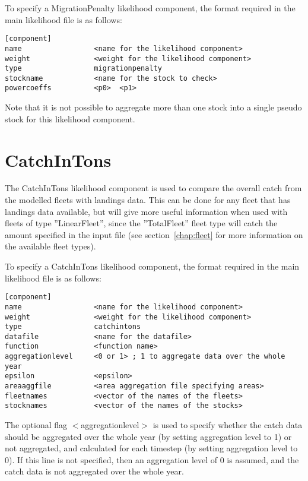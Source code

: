 \documentclass [a4paper, 10pt]{book}
\begin{document}
\bigskip
To specify a MigrationPenalty likelihood component, the format required in the main likelihood file is as follows:

{\small\begin{verbatim}
[component]
name                 <name for the likelihood component>
weight               <weight for the likelihood component>
type                 migrationpenalty
stockname            <name for the stock to check>
powercoeffs          <p0>  <p1>
\end{verbatim}}

Note that it is not possible to aggregate more than one stock into a single pseudo stock for this likelihood component.

\section{CatchInTons}\label{sec:catchintons}
The CatchInTons likelihood component is used to compare the overall catch from the modelled fleets with landings data.  This can be done for any fleet that has landings data available, but will give more useful information when used with fleets of type ''LinearFleet'', since the ''TotalFleet'' fleet type will catch the amount specified in the input file (see section~\ref{chap:fleet} for more information on the available fleet types).

\bigskip
To specify a CatchInTons likelihood component, the format required in the main likelihood file is as follows:

{\small\begin{verbatim}
[component]
name                 <name for the likelihood component>
weight               <weight for the likelihood component>
type                 catchintons
datafile             <name for the datafile>
function             <function name>
aggregationlevel     <0 or 1> ; 1 to aggregate data over the whole year
epsilon              <epsilon>
areaaggfile          <area aggregation file specifying areas>
fleetnames           <vector of the names of the fleets>
stocknames           <vector of the names of the stocks>
\end{verbatim}}

The optional flag $<$aggregationlevel$>$ is used to specify whether the catch data should be aggregated over the whole year (by setting aggregation level to 1) or not aggregated, and calculated for each timestep (by setting aggregation level to 0).  If this line is not specified, then an aggregation level of 0 is assumed, and the catch data is not aggregated over the whole year.
\end{document}
